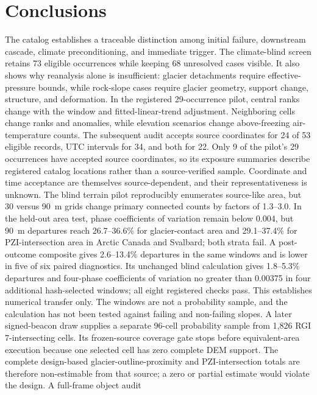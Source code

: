 \documentclass[11pt]{article}
\begin{document}
\section{Conclusions}

The catalog establishes a traceable distinction among initial failure,
downstream cascade, climate preconditioning, and immediate trigger. The
climate-blind screen retains 73 eligible occurrences while keeping 68
unresolved cases visible. It also shows why reanalysis alone is insufficient:
glacier detachments require effective-pressure bounds, while rock-slope cases
require glacier geometry, support change, structure, and deformation.
In the registered 29-occurrence pilot, central ranks change with the window
and fitted-linear-trend adjustment. Neighboring cells change ranks and
anomalies, while elevation scenarios change above-freezing air-temperature
counts. The subsequent audit accepts source coordinates for 24 of 53 eligible
records, UTC intervals for 34, and both for 22. Only 9 of the pilot's 29
occurrences have accepted source coordinates, so its exposure summaries
describe registered catalog locations rather than a source-verified sample.
Coordinate and time acceptance are themselves source-dependent, and their
representativeness is unknown.
The blind terrain pilot reproducibly enumerates source-like area, but 30 versus
90~m grids change primary connected counts by factors of 1.3--3.0. In the
held-out area test, phase coefficients of variation remain below 0.004, but
90~m departures reach 26.7--36.6\% for glacier-contact area and 29.1--37.4\%
for PZI-intersection area in Arctic Canada and Svalbard; both strata fail. A
post-outcome composite gives 2.6--13.4\% departures in the same windows and is
lower in five of six paired diagnostics. Its unchanged blind calculation gives
1.8--5.3\% departures and four-phase coefficients of variation no greater than
0.00375 in four additional hash-selected windows; all eight registered checks
pass. This establishes numerical transfer only. The windows are not a
probability sample, and the calculation has not been tested against failing and
non-failing slopes. A later signed-beacon draw supplies a separate 96-cell
probability sample from 1,826 RGI 7-intersecting cells. Its frozen-source
coverage gate stops before equivalent-area execution because one selected cell
has zero complete DEM support. The complete design-based
glacier-outline-proximity and PZI-intersection totals are therefore
non-estimable from that source; a
zero or partial estimate would violate the design. A full-frame object audit
\end{document}
